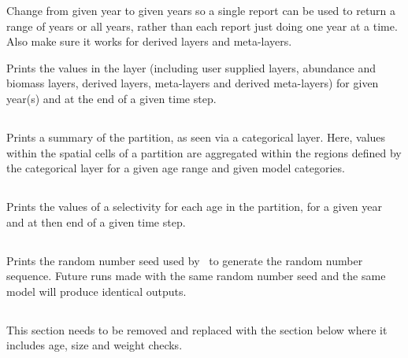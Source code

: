 \TODO

Change from given year to given years so a single report can be used to return a range of years or all years, rather than each report just doing one year at a time. Also make sure it works for derived layers and meta-layers.

\TODOend

Prints the values in the layer (including user supplied layers, abundance and biomass layers, derived layers, meta-layers and derived meta-layers) for given year(s) and at the end of a given time step. 

\subsection{}

Prints a summary of the partition, as seen via a categorical layer. Here, values within the spatial cells of a partition are aggregated within the regions defined by the categorical layer for a given age range and given model categories.

\subsection{}

Prints the values of a selectivity for each age in the partition, for a given year and at then end of a given time step.

\subsection{}

Prints the random number seed used by \SPM\ to generate the random number sequence. Future runs made with the same random number seed and the same model will produce identical outputs.

\subsection{\label{sec:report-weight-at-size}}

\TOUNDO
 
This section needs to be removed and replaced with the section below where it includes age, size and weight checks.

